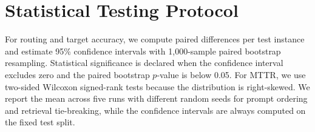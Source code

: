 \documentclass[conference]{IEEEtran}
\begin{document}
\begin{table}[t]
\centering
\caption{Key hyperparameters and runtime limits.}
\label{tab:hyperparams}
\end{table}

\section{Statistical Testing Protocol}
\label{app:stats}
For routing and target accuracy, we compute paired differences per test instance and estimate 95\% confidence intervals with 1{,}000-sample paired bootstrap resampling. Statistical significance is declared when the confidence interval excludes zero and the paired bootstrap $p$-value is below 0.05. For MTTR, we use two-sided Wilcoxon signed-rank tests because the distribution is right-skewed. We report the mean across five runs with different random seeds for prompt ordering and retrieval tie-breaking, while the confidence intervals are always computed on the fixed test split.
\end{document}
